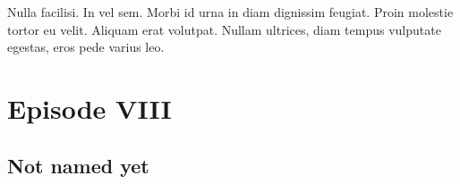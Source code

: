 \graphicspath{{figures/appendix/}}


\begin{savequote}[75mm]
Nulla facilisi. In vel sem. Morbi id urna in diam dignissim feugiat. Proin molestie tortor eu velit. Aliquam erat volutpat. Nullam    ultrices, diam tempus vulputate egestas, eros pede varius leo.
\end{savequote}

\chapter{Episode VIII}
		\label{appendix-2}


\section{Not named yet}

\lipsum[56-70]\cite{Lucas8}



